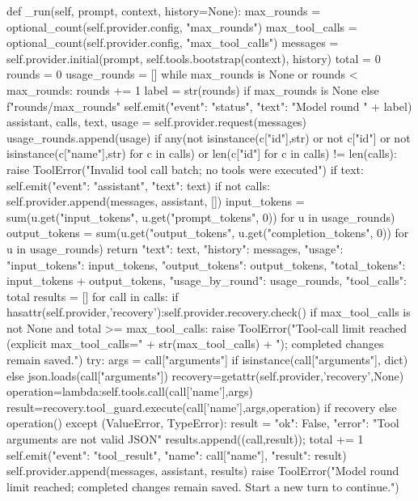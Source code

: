     def _run(self, prompt, context, history=None):
        max_rounds = optional_count(self.provider.config, "max_rounds")
        max_tool_calls = optional_count(self.provider.config, "max_tool_calls")
        messages = self.provider.initial(prompt, self.tools.bootstrap(context), history)
        total = 0
        rounds = 0
        usage_rounds = []
        while max_rounds is None or rounds < max_rounds:
            rounds += 1
            label = str(rounds) if max_rounds is None else f"{rounds}/{max_rounds}"
            self.emit({"event": "status", "text": "Model round " + label})
            assistant, calls, text, usage = self.provider.request(messages)
            usage_rounds.append(usage)
            if any(not isinstance(c["id"],str) or not c["id"] or not isinstance(c["name"],str) for c in calls) or len({c["id"] for c in calls}) != len(calls):
                raise ToolError("Invalid tool call batch; no tools were executed")
            if text:
                self.emit({"event": "assistant", "text": text})
            if not calls:
                self.provider.append(messages, assistant, [])
                input_tokens = sum(u.get("input_tokens", u.get("prompt_tokens", 0)) for u in usage_rounds)
                output_tokens = sum(u.get("output_tokens", u.get("completion_tokens", 0)) for u in usage_rounds)
                return {"text": text, "history": messages,
                    "usage": {"input_tokens": input_tokens, "output_tokens": output_tokens, "total_tokens": input_tokens + output_tokens},
                    "usage_by_round": usage_rounds, "tool_calls": total}
            results = []
            for call in calls:
                if hasattr(self.provider,'recovery'):self.provider.recovery.check()
                if max_tool_calls is not None and total >= max_tool_calls:
                    raise ToolError("Tool-call limit reached (explicit max_tool_calls=" + str(max_tool_calls) + "); completed changes remain saved.")
                try:
                    args = call["arguments"] if isinstance(call["arguments"], dict) else json.loads(call["arguments"])
                    recovery=getattr(self.provider,'recovery',None)
                    operation=lambda:self.tools.call(call['name'],args)
                    result=recovery.tool_guard.execute(call['name'],args,operation) if recovery else operation()
                except (ValueError, TypeError):
                    result = {"ok": False, "error": "Tool arguments are not valid JSON"}
                results.append((call,result)); total += 1
                self.emit({"event": "tool_result", "name": call["name"], "result": result})
            self.provider.append(messages, assistant, results)
        raise ToolError("Model round limit reached; completed changes remain saved. Start a new turn to continue.")

